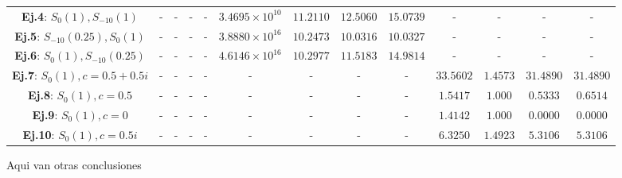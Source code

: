 \begin{table}
\begin{tabular}{|c|cccc|cccc|cccc|}
		\textbf{Ej.4}: $S_{0}(1), S_{-10}(1)$    & -                                             & -                                                & -                                   & -        & $3.4695 \times 10^{10}$ & $11.2110$      & $12.5060$               & $15.0739$ & -              & -              & -                       & -         \\
		\textbf{Ej.5}: $S_{-10}(0.25), S_{0}(1)$ & -                                             & -                                                & -                                   & -        & $3.8880 \times 10^{16}$ & $10.2473$      & $10.0316$               & $10.0327$ & -              & -              & -                       & -         \\
		\textbf{Ej.6}: $S_{0}(1), S_{-10}(0.25)$ & -                                             & -                                                & -                                   & -        & $4.6146 \times 10^{16}$ & $10.2977$      & $11.5183$               & $14.9814$ & -              & -              & -                       & -         \\
		\textbf{Ej.7}: $S_{0}(1), c=0.5+0.5i$    & -                                             & -                                                & -                                   & -        & -                       & -              & -                       & -         & $33.5602$      & $1.4573$       & $31.4890$               & $31.4890$ \\
		\textbf{Ej.8}: $S_{0}(1), c=0.5$         & -                                             & -                                                & -                                   & -        & -                       & -              & -                       & -         & $1.5417$       & $1.000$        & $0.5333$                & $0.6514$  \\
		\textbf{Ej.9}: $S_{0}(1), c=0$           & -                                             & -                                                & -                                   & -        & -                       & -              & -                       & -         & $1.4142$       & $1.000$        & $0.0000$                & $0.0000$  \\
		\textbf{Ej.10}: $S_{0}(1), c=0.5i$       & -                                             & -                                                & -                                   & -        & -                       & -              & -                       & -         & $6.3250$       & $1.4923$       & $5.3106$                & $5.3106$  \\
		\hline
	\end{tabular}
\end{table}

\newpage

Aqui van otras conclusiones